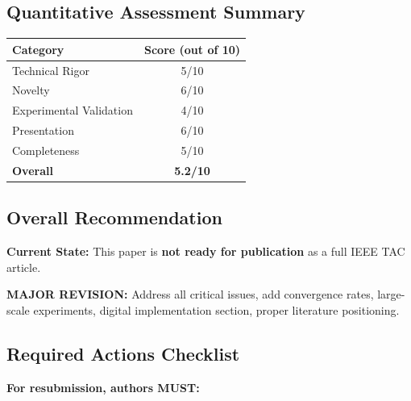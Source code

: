 \documentclass[journal,twoside,web]{ieeecolor}
\begin{document}
\subsection*{Quantitative Assessment Summary}

\begin{tabular}{lc}
\hline
\textbf{Category} & \textbf{Score (out of 10)} \\
\hline
Technical Rigor & 5/10 \\
Novelty & 6/10 \\
Experimental Validation & 4/10 \\
Presentation & 6/10 \\
Completeness & 5/10 \\
\hline
\textbf{Overall} & \textbf{5.2/10} \\
\hline
\end{tabular}

\subsection*{Overall Recommendation}

\textbf{Current State:} This paper is \textbf{not ready for publication} as a full IEEE TAC article.

\textbf{MAJOR REVISION:} Address all critical issues, add convergence rates, large-scale experiments, digital implementation section, proper literature positioning.

\subsection*{Required Actions Checklist}

\textbf{For resubmission, authors MUST:}
\end{document}

